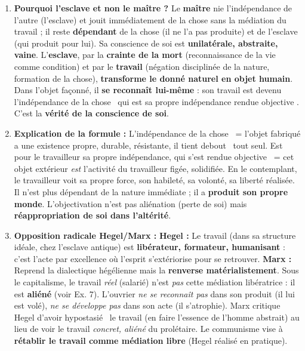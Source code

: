 \documentclass[11pt]{article}
\begin{document}
\begin{corrige}
\begin{enumerate}
\item \textbf{Pourquoi l'esclave et non le maître ?} Le \textbf{maître} nie l'indépendance de l'autre (l'esclave) et jouit immédiatement de la chose sans la médiation du travail ; il reste \textbf{dépendant} de la chose (il ne l'a pas produite) et de l'esclave (qui produit pour lui). Sa conscience de soi est \textbf{unilatérale, abstraite, vaine}. L'\textbf{esclave}, par la \textbf{crainte de la mort} (reconnaissance de la vie comme condition) et par le \textbf{travail} (négation disciplinée de la nature, formation de la chose), \textbf{transforme le donné naturel en objet humain}. Dans l'objet façonné, il \textbf{se reconnaît lui-même} : son travail est devenu \guillemotleft l'indépendance de la chose \guillemotright\ qui est \guillemotleft sa propre indépendance rendue objective \guillemotright. C'est la \textbf{vérité de la conscience de soi}.
\item \textbf{Explication de la formule :} \guillemotleft L'indépendance de la chose \guillemotright\ = l'objet fabriqué a une existence propre, durable, résistante, il \guillemotleft tient debout \guillemotright\ tout seul. \guillemotleft Est pour le travailleur sa propre indépendance, qui s'est rendue objective \guillemotright\ = cet objet extérieur \emph{est} l'activité du travailleur figée, solidifiée. En le contemplant, le travailleur voit sa propre force, son habileté, sa volonté, sa liberté réalisée. Il n'est plus dépendant de la nature immédiate ; il a \textbf{produit son propre monde}. L'objectivation n'est pas aliénation (perte de soi) mais \textbf{réappropriation de soi dans l'altérité}.
\item \textbf{Opposition radicale Hegel/Marx :} \textbf{Hegel :} Le travail (dans sa structure idéale, chez l'esclave antique) est \textbf{libérateur, formateur, humanisant} : c'est l'acte par excellence où l'esprit s'extériorise pour se retrouver. \textbf{Marx :} Reprend la dialectique hégélienne mais la \textbf{renverse matérialistement}. Sous le capitalisme, le travail \emph{réel} (salarié) n'est \emph{pas} cette médiation libératrice : il est \textbf{aliéné} (voir Ex. 7). L'ouvrier \emph{ne se reconnaît pas} dans son produit (il lui est volé), \emph{ne se développe pas} dans son acte (il s'atrophie). Marx critique Hegel d'avoir \guillemotleft hypostasié \guillemotright\ le travail (en faire l'essence de l'homme abstrait) au lieu de voir le travail \emph{concret, aliéné} du prolétaire. Le communisme vise à \textbf{rétablir le travail comme médiation libre} (Hegel réalisé en pratique).

\end{enumerate}
\end{corrige}
\end{document}
